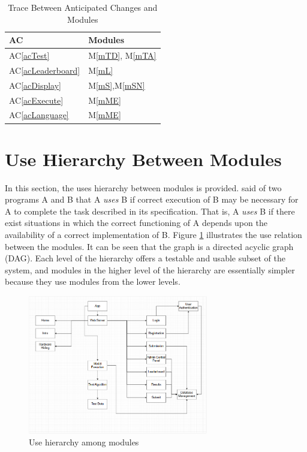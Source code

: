 \documentclass[12pt, titlepage]{article}
\newcommand{\acref}[1]{AC\ref{#1}}
\newcommand{\mref}[1]{M\ref{#1}}
\begin{document}
\begin{table}[H]
\centering
\begin{tabular}{p{} p{}}
\toprule
\textbf{AC} & \textbf{Modules}\\
\midrule
\acref{acTest} & \mref{mTD}, \mref{mTA}\\
\acref{acLeaderboard} & \mref{mL}\\
\acref{acDisplay} & \mref{mS},\mref{mSN}\\
\acref{acExecute} & \mref{mME}\\
\acref{acLanguage} & \mref{mME}\\
\bottomrule
\end{tabular}
\caption{Trace Between Anticipated Changes and Modules}
\label{TblACT}
\end{table}

\section{Use Hierarchy Between Modules} \label{SecUse}

In this section, the uses hierarchy between modules is
provided. \citet{Parnas1978} said of two programs A and B that A {\em uses} B if
correct execution of B may be necessary for A to complete the task described in
its specification. That is, A {\em uses} B if there exist situations in which
the correct functioning of A depends upon the availability of a correct
implementation of B.  Figure \ref{FigUH} illustrates the use relation between
the modules. It can be seen that the graph is a directed acyclic graph
(DAG). Each level of the hierarchy offers a testable and usable subset of the
system, and modules in the higher level of the hierarchy are essentially simpler
because they use modules from the lower levels.

\begin{figure}[H]
\centering
\includegraphics[width=0.7\textwidth]{Use_Hierarchy.png}
\caption{Use hierarchy among modules}
\label{FigUH}
\end{figure}
\end{document}
